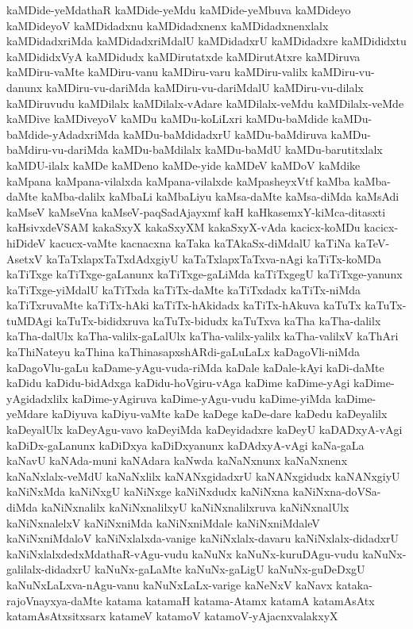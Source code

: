 {kaMDide-yeMdathaR
kaMDide-yeMdu
kaMDide-yeMbuva
kaMDideyo
kaMDideyoV
kaMDidadxnu
kaMDidadxnenx
kaMDidadxnenxlalx
kaMDidadxriMda
kaMDidadxriMdalU
kaMDidadxrU
kaMDidadxre
kaMDididxtu
kaMDididxVyA
kaMDidudx
kaMDirutatxde
kaMDirutAtxre
kaMDiruva
kaMDiru-vaMte
kaMDiru-vanu
kaMDiru-varu
kaMDiru-valilx
kaMDiru-vu-danunx
kaMDiru-vu-dariMda
kaMDiru-vu-dariMdalU
kaMDiru-vu-dilalx
kaMDiruvudu
kaMDilalx
kaMDilalx-vAdare
kaMDilalx-veMdu
kaMDilalx-veMde
kaMDive
kaMDiveyoV
kaMDu
kaMDu-koLiLxri
kaMDu-baMdide
kaMDu-baMdide-yAdadxriMda
kaMDu-baMdidadxrU
kaMDu-baMdiruva
kaMDu-baMdiru-vu-dariMda
kaMDu-baMdilalx
kaMDu-baMdU
kaMDu-barutitxlalx
kaMDU-ilalx
kaMDe
kaMDeno
kaMDe-yide
kaMDeV
kaMDoV
kaMdike
kaMpana
kaMpana-vilalxda
kaMpana-vilalxde
kaMpasheyxVtf
kaMba
kaMba-daMte
kaMba-dalilx
kaMbaLi
kaMbaLiyu
kaMsa-daMte
kaMsa-diMda
kaMsAdi
kaMseV
kaMseVna
kaMseV-paqSadAjayxmf
kaH
kaHkasemxY-kiMca-ditasxti
kaHsivxdeVSAM
kakaSxyX
kakaSxyXM
kakaSxyX-vAda
kacicx-koMDu
kacicx-hiDideV
kacucx-vaMte
kacnacxna
kaTaka
kaTAkaSx-diMdalU
kaTiNa
kaTeV-AsetxV
kaTaTxlapxTaTxdAdxgiyU
kaTaTxlapxTaTxva-nAgi
kaTiTx-koMDa
kaTiTxge
kaTiTxge-gaLanunx
kaTiTxge-gaLiMda
kaTiTxgegU
kaTiTxge-yanunx
kaTiTxge-yiMdalU
kaTiTxda
kaTiTx-daMte
kaTiTxdadx
kaTiTx-niMda
kaTiTxruvaMte
kaTiTx-hAki
kaTiTx-hAkidadx
kaTiTx-hAkuva
kaTuTx
kaTuTx-tuMDAgi
kaTuTx-bididxruva
kaTuTx-bidudx
kaTuTxva
kaTha
kaTha-dalilx
kaTha-dalUlx
kaTha-valilx-gaLalUlx
kaTha-valilx-yalilx
kaTha-valilxV
kaThAri
kaThiNateyu
kaThina
kaThinasapxshARdi-gaLuLaLx
kaDagoVli-niMda
kaDagoVlu-gaLu
kaDame-yAgu-vuda-riMda
kaDale
kaDale-kAyi
kaDi-daMte
kaDidu
kaDidu-bidAdxga
kaDidu-hoVgiru-vAga
kaDime
kaDime-yAgi
kaDime-yAgidadxlilx
kaDime-yAgiruva
kaDime-yAgu-vudu
kaDime-yiMda
kaDime-yeMdare
kaDiyuva
kaDiyu-vaMte
kaDe
kaDege
kaDe-dare
kaDedu
kaDeyalilx
kaDeyalUlx
kaDeyAgu-vavo
kaDeyiMda
kaDeyidadxre
kaDeyU
kaDADxyA-vAgi
kaDiDx-gaLanunx
kaDiDxya
kaDiDxyanunx
kaDAdxyA-vAgi
kaNa-gaLa
kaNavU
kaNAda-muni
kaNAdara
kaNwda
kaNaNxnunx
kaNaNxnenx
kaNaNxlalx-veMdU
kaNaNxlilx
kaNANxgidadxrU
kaNANxgidudx
kaNANxgiyU
kaNiNxMda
kaNiNxgU
kaNiNxge
kaNiNxdudx
kaNiNxna
kaNiNxna-doVSa-diMda
kaNiNxnalilx
kaNiNxnalilxyU
kaNiNxnalilxruva
kaNiNxnalUlx
kaNiNxnalelxV
kaNiNxniMda
kaNiNxniMdale
kaNiNxniMdaleV
kaNiNxniMdaloV
kaNiNxlalxda-vanige
kaNiNxlalx-davaru
kaNiNxlalx-didadxrU
kaNiNxlalxdedxMdathaR-vAgu-vudu
kaNuNx
kaNuNx-kuruDAgu-vudu
kaNuNx-galilalx-didadxrU
kaNuNx-gaLaMte
kaNuNx-gaLigU
kaNuNx-guDeDxgU
kaNuNxLaLxva-nAgu-vanu
kaNuNxLaLx-varige
kaNeNxV
kaNavx
kataka-rajoVnayxya-daMte
katama
katamaH
katama-Atamx
katamA
katamAsAtx
katamAsAtxsitxsarx
katameV
katamoV
katamoV-yAjacnxvalakxyX
}
